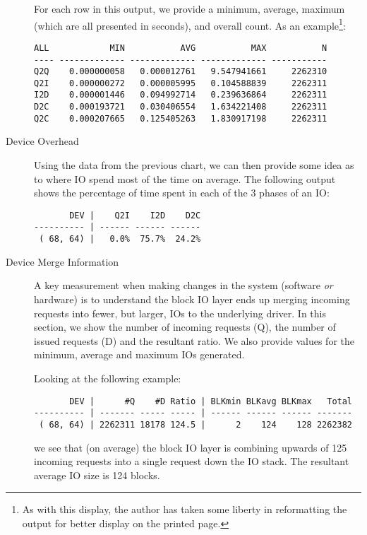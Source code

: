 \documentclass{article}
\begin{document}
\begin{description}
\begin{enumerate}
    \end{enumerate}

  For each row in this output, we provide a minimum, average, maximum
  (which are all presented in seconds), and overall count. As an
  example\footnote{As with this display, the author has taken some liberty
  in reformatting the output for better display on the printed page.}:

\begin{verbatim}
ALL            MIN           AVG           MAX           N
---- ------------- ------------- ------------- -----------
Q2Q    0.000000058   0.000012761   9.547941661     2262310
Q2I    0.000000272   0.000005995   0.104588839     2262311
I2D    0.000001446   0.094992714   0.239636864     2262311
D2C    0.000193721   0.030406554   1.634221408     2262311
Q2C    0.000207665   0.125405263   1.830917198     2262311
\end{verbatim}

  \item[Device Overhead]

  Using the data from the previous chart, we can then provide some idea
  as to where IO spend most of the time on average. The following output
  shows the percentage of time spent in each of the 3 phases of an IO:

\begin{verbatim}
       DEV |    Q2I    I2D    D2C
---------- | ------ ------ ------
 ( 68, 64) |   0.0%  75.7%  24.2%
\end{verbatim}

  \item[Device Merge Information]

  A key measurement when making changes in the system (software \emph{or}
  hardware) is to understand the block IO layer ends up merging incoming
  requests into fewer, but larger, IOs to the underlying driver. In this
  section, we show the number of incoming requests (Q), the number of
  issued requests (D) and the resultant ratio. We also provide values
  for the minimum, average and maximum IOs generated.

  Looking at the following example:

\begin{verbatim}
       DEV |      #Q    #D Ratio | BLKmin BLKavg BLKmax   Total
---------- | ------- ----- ----- | ------ ------ ------ -------
 ( 68, 64) | 2262311 18178 124.5 |      2    124    128 2262382
\end{verbatim}

  we see that (on average) the block IO layer is combining upwards of
  125 incoming requests into a single request down the IO stack. The
  resultant average IO size is 124 blocks.


\end{description}
\end{document}
